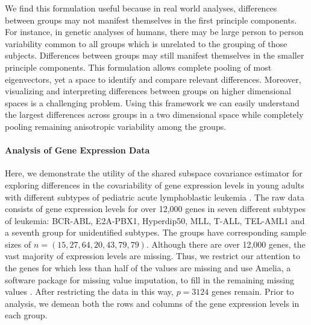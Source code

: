\documentclass{article}
\begin{document}
We find this formulation useful because in real world analyses,
differences between groups may not manifest themselves in the first
principle components.  For instance, in genetic analyses of humans,
there may be large person to person variability common to all groups
which is unrelated to the grouping of those subjects. Differences
between groups may still manifest themselves in the smaller principle
components. This formulation allows complete pooling of most
eigenvectors, yet a space to identify and compare relevant
differences.  Moreover, visualizing and interpreting differences
between groups on higher dimensional spaces is a challenging problem.
Using this framework we can easily understand the largest differences
across groups in a two dimensional space while completely pooling
remaining anisotropic variability among the groups.

\paragraph{Analysis of Gene Expression Data}

Here, we demonstrate the utility of the shared subspace covariance
estimator for exploring differences in the covariability of gene
expression levels in young adults with different subtypes of pediatric
acute lymphoblastic leukemia \citep{Yeoh2002}.  The raw data consists
of gene expression levels for over 12,000 genes in seven different
subtypes of leukemia: BCR-ABL, E2A-PBX1, Hyperdip50, MLL, T-ALL,
TEL-AML1 and a seventh group for unidentified subtypes.  The groups
have corresponding sample sizes of $n = (15, 27, 64, 20, 43, 79, 79)$.
Although there are over 12,000 genes, the vast majority of expression
levels are missing.  Thus, we restrict our attention to the genes for
which less than half of the values are missing and use Amelia, a
software package for missing value imputation, to fill in the
remaining missing values \citep{Amelia}.  After restricting the data
in this way, $p=3124$ genes remain.  Prior to analysis, we demean both
the rows and columns of the gene expression levels in each group.
\end{document}
